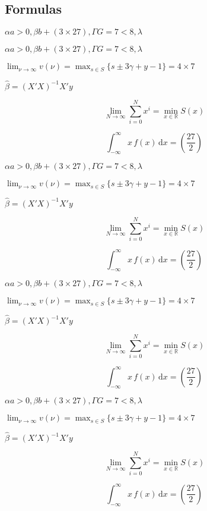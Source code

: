\subsection{Formulas \showfamily}

\noindent%
\checkgreekletters

\noindent%
{\boldmath\checkgreekletters}

\noindent%
{\sffamily\selectfont \checkgreekletters}

\noindent%
{\sffamily\bfseries\selectfont \checkgreekletters}

\noindent%
{\sffamily $\alpha a > 0, \beta b + (3 \times 27), \Gamma G = 7 < 8, \lambda$}

\noindent%
$\alpha a > 0, \beta b + (3 \times 27), \Gamma G = 7 < 8, \lambda$

$\lim_{\nu \to \infty} v(\nu) = \max_{s \in S} \{s \pm 3 \gamma + y - 1\} = 4 \times 7$

$\hat{\beta} = (X'X)^{-1}X'y$

$$\lim_{N \to \infty} \sum_{i=0}^{N} x^i = \min_{x \in \mathbb{R}} S(x)$$

$$\int_{-\infty}^{\infty} x\,f(x)\,\mathup{d}x = \left( \frac{27}{2} \right)$$

\noindent%
{\bfseries%
$\alpha a > 0, \beta b + (3 \times 27), \Gamma G = 7 < 8, \lambda$

$\lim_{\nu \to \infty} v(\nu) = \max_{s \in S} \{s \pm 3 \gamma + y - 1\} = 4 \times 7$

$\hat{\beta} = (X'X)^{-1}X'y$

$$\lim_{N \to \infty} \sum_{i=0}^{N} x^i = \min_{x \in \mathbb{R}} S(x)$$

$$\int_{-\infty}^{\infty} x\,f(x)\,\mathup{d}x = \left( \frac{27}{2} \right)$$
}

\noindent%
{\sffamily%
$\alpha a > 0, \beta b + (3 \times 27), \Gamma G = 7 < 8, \lambda$

$\lim_{\nu \to \infty} v(\nu) = \max_{s \in S} \{s \pm 3 \gamma + y - 1\} = 4 \times 7$

$\hat{\beta} = (X'X)^{-1}X'y$

$$\lim_{N \to \infty} \sum_{i=0}^{N} x^i = \min_{x \in \mathbb{R}} S(x)$$

$$\int_{-\infty}^{\infty} x\,f(x)\,\mathup{d}x = \left( \frac{27}{2} \right)$$
}

\noindent%
{\sffamily\bfseries%
$\alpha a > 0, \beta b + (3 \times 27), \Gamma G = 7 < 8, \lambda$

$\lim_{\nu \to \infty} v(\nu) = \max_{s \in S} \{s \pm 3 \gamma + y - 1\} = 4 \times 7$

$\hat{\beta} = (X'X)^{-1}X'y$

$$\lim_{N \to \infty} \sum_{i=0}^{N} x^i = \min_{x \in \mathbb{R}} S(x)$$

$$\int_{-\infty}^{\infty} x\,f(x)\,\mathup{d}x = \left( \frac{27}{2} \right)$$
}


